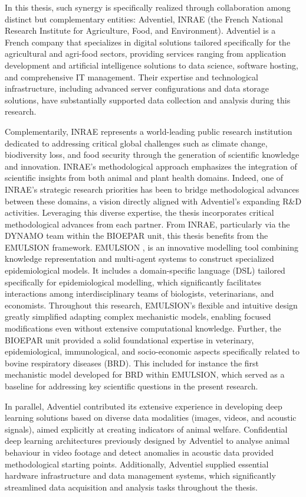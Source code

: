 In this thesis, such synergy is specifically realized through collaboration among distinct but complementary entities: Adventiel, INRAE (the French National Research Institute for Agriculture, Food, and Environment). Adventiel is a French company that specializes in digital solutions tailored specifically for the agricultural and agri-food sectors, providing services ranging from application development and artificial intelligence solutions to data science, software hosting, and comprehensive IT management. Their expertise and technological infrastructure, including advanced server configurations and data storage solutions, have substantially supported data collection and analysis during this research.

Complementarily, INRAE represents a world-leading public research institution dedicated to addressing critical global challenges such as climate change, biodiversity loss, and food security through the generation of scientific knowledge and innovation. INRAE's methodological approach emphasizes the integration of scientific insights from both animal and plant health domains. Indeed, one of INRAE's strategic research priorities has been to bridge methodological advances between these domains, a vision directly aligned with Adventiel's expanding R\&D activities. Leveraging this diverse expertise, the thesis incorporates critical methodological advances from each partner. From INRAE, particularly via the DYNAMO team within the BIOEPAR unit, this thesis benefits from the EMULSION framework. EMULSION \cite{EMULSION-ploscb2019}, is an innovative modelling tool combining knowledge representation and multi-agent systems to construct specialized epidemiological models. It includes a domain-specific language (DSL) tailored specifically for epidemiological modelling, which significantly facilitates interactions among interdisciplinary teams of biologists, veterinarians, and economists. Throughout this research, EMULSION's flexible and intuitive design greatly simplified adapting complex mechanistic models, enabling focused modifications even without extensive computational knowledge. Further, the BIOEPAR unit provided a solid foundational expertise in veterinary, epidemiological, immunological, and socio-economic aspects specifically related to bovine respiratory diseases (BRD). This included for instance the first mechanistic model developed for BRD within EMULSION, which served as a baseline for addressing key scientific questions in the present research.

In parallel, Adventiel contributed its extensive experience in developing deep learning solutions based on diverse data modalities (images, videos, and acoustic signals), aimed explicitly at creating indicators of animal welfare. Confidential deep learning architectures previously designed by Adventiel to analyse animal behaviour in video footage and detect anomalies in acoustic data provided methodological starting points. Additionally, Adventiel supplied essential hardware infrastructure and data management systems, which significantly streamlined data acquisition and analysis tasks throughout the thesis.

